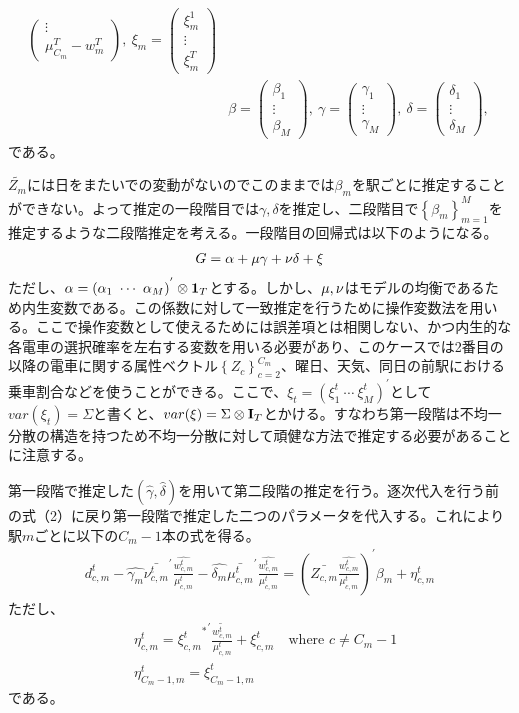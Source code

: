 \documentclass{jsarticle}
\begin{document}
\begin{align*}
\begin{pmatrix}
	\vdots\\
	\mu_{C_m}^T - w_m^T\end{pmatrix},\ \xi_m = \begin{pmatrix} \xi_m^1\\
	\vdots\\
	\xi_m^T \end{pmatrix}\\[8pt]
	&\beta = \begin{pmatrix}\beta_1\\
	\vdots\\
	\beta_M\end{pmatrix},\ \gamma = \begin{pmatrix}\gamma_1\\
	\vdots\\
	\gamma_M\end{pmatrix},\ \delta = \begin{pmatrix}\delta_1\\
	\vdots\\
	\delta_M\end{pmatrix},\
\end{align*}
である。

$\tilde{Z_m}$には日をまたいでの変動がないのでこのままでは$\beta_m$を駅ごとに推定することができない。よって推定の一段階目では$\gamma, \delta$を推定し、二段階目で$\left\{ \beta_m \right\}_{m = 1}^{M}$を推定するような二段階推定を考える。一段階目の回帰式は以下のようになる。
\begin{align*}
	G = \alpha + {\bf \mu} \gamma + {\bf \nu} \delta + \xi
\end{align*}
ただし、$\alpha = \left( \alpha_1\ \cdots\ \alpha_M \right)^{'} \otimes {\bf 1}_T$とする。しかし、${\bf \mu}, {\bf \nu}$はモデルの均衡であるため内生変数である。この係数に対して一致推定を行うために操作変数法を用いる。ここで操作変数として使えるためには誤差項とは相関しない、かつ内生的な各電車の選択確率を左右する変数を用いる必要があり、このケースでは2番目の以降の電車に関する属性ベクトル$\left\{ Z_c \right\}_{c = 2}^{C_m}$、曜日、天気、同日の前駅における乗車割合などを使うことができる。ここで、$\xi_t = \left( \xi_1^t\ \cdots\ \xi_M^t \right)^{'}$として$var(\xi_t) = \Sigma$と書くと、$var(\xi) = \Sigma \otimes {\bf I}_T$とかける。すなわち第一段階は不均一分散の構造を持つため不均一分散に対して頑健な方法で推定する必要があることに注意する。

第一段階で推定した$\left( \hat{\gamma}, \hat{\delta} \right)$を用いて第二段階の推定を行う。逐次代入を行う前の式（2）に戻り第一段階で推定した二つのパラメータを代入する。これにより駅$m$ごとに以下の$C_m-1$本の式を得る。
\begin{align}
	d_{c,m}^t - \hat{\gamma_m} \bar{\nu_{c,m}^t}^{'} \frac{\hat{w_{c,m}^t}}{\mu_{c,m}^t} - \hat{\delta_m} \bar{\mu_{c,m}^t}^{'} \frac{\hat{w_{c,m}^t}}{\mu_{c,m}^t} = \left( \bar{Z_{c,m}} \frac{\hat{w_{c,m}^t}}{\mu_{c,m}^t}\right)^{'} \beta_m + \eta_{c,m}^t
\end{align}
ただし、
\begin{align*}
	&\eta_{c,m}^t = {{\xi_{c,m}^t}^{*}}^{'} \frac{\tilde{w_{c,m}^t}}{\mu_{c,m}^t} + \xi_{c,m}^t\quad \text{where $c \neq C_m-1$}\\[8pt]
	&\eta_{C_m-1, m}^t = \xi_{C_m-1,m}^t\quad 
\end{align*}
である。
\end{document}
